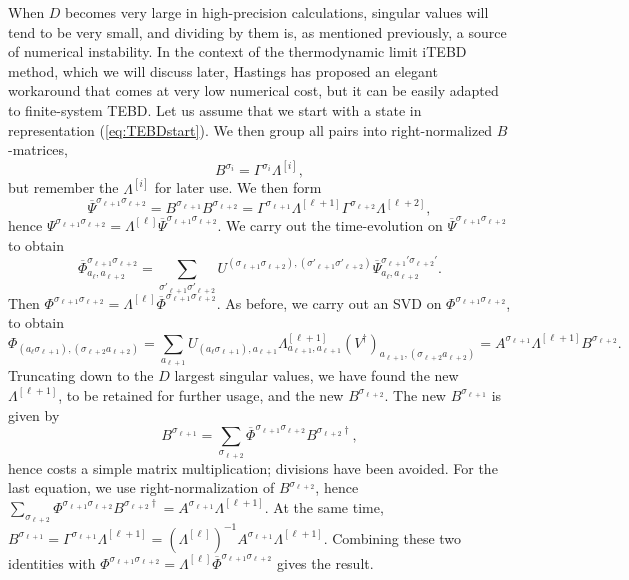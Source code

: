 When $D$ becomes very large in high-precision calculations, singular values will tend to be very small, and dividing by them is, as mentioned previously, a source of numerical instability. In the context of the thermodynamic limit iTEBD method, which we will discuss later, Hastings has proposed an elegant workaround that comes at very low numerical cost\cite{Hastings09}, but it can be easily adapted to finite-system TEBD. Let us assume that we start with a state in representation (\ref{eq:TEBDstart}). We then group all pairs into right-normalized $B$-matrices,
\begin{equation}
B^{\sigma_i} = \Gamma^{\sigma_i} \Lambda^{[i]} ,
\end{equation}
but remember the $\Lambda^{[i]}$ for later use. We then form
\begin{equation}
\overline{\Psi}^{\sigma_{\ell+1} \sigma_{\ell+2}} = B^{\sigma_{\ell+1}} B^{\sigma_{\ell+2}} =  \Gamma^{\sigma_{\ell+1}} \Lambda^{[\ell+1]}
\Gamma^{\sigma_{\ell+2}} \Lambda^{[\ell+2]} ,
\end{equation}
hence $\Psi^{\sigma_{\ell+1} \sigma_{\ell+2}} = \Lambda^{[\ell]} \overline{\Psi}^{\sigma_{\ell+1} \sigma_{\ell+2}}$. We carry out the time-evolution on $\overline{\Psi}^{\sigma_{\ell+1} \sigma_{\ell+2}}$ to obtain
\begin{equation}
\overline{\Phi}^{\sigma_{\ell+1}\sigma_{\ell+2}}_{a_\ell, a_{\ell+2}} = \sum_{\sigma'_{\ell+1} \sigma'_{\ell+2}}
U^{(\sigma_{\ell+1} \sigma_{\ell+2}), (\sigma'_{\ell+1} \sigma'_{\ell+2})}  \overline{\Psi}^{\sigma_{\ell+1}'\sigma_{\ell+2}'}_{a_\ell, a_{\ell+2}} .
\end{equation} 
Then $\Phi^{\sigma_{\ell+1} \sigma_{\ell+2}} = \Lambda^{[\ell]} \overline{\Phi}^{\sigma_{\ell+1} \sigma_{\ell+2}}$. As before, we carry out an SVD on $\Phi^{\sigma_{\ell+1} \sigma_{\ell+2}}$, to obtain 
\begin{equation}
\Phi_{(a_\ell \sigma_{\ell+1}), (\sigma_{\ell+2} a_{\ell+2})} = \sum_{a_{\ell+1}} U_{(a_\ell \sigma_{\ell+1}),a_{\ell+1}} \Lambda^{[\ell+1]}_{a_{\ell+1},a_{\ell+1}} (V^\dagger)_{a_{\ell+1}, (\sigma_{\ell+2} a_{\ell+2})} = A^{\sigma_{\ell+1}} \Lambda^{[\ell+1]} B^{\sigma_{\ell+2}} .
\end{equation}
Truncating down to the $D$ largest singular values, we have found the new $\Lambda^{[\ell+1]}$, to be retained for further usage, and the new $B^{\sigma_{\ell+2}}$. The new $B^{\sigma_{\ell+1}}$
is given by 
\begin{equation}
B^{\sigma_{\ell+1}} = \sum_{\sigma_{\ell+2}}  \overline{\Phi}^{\sigma_{\ell+1}\sigma_{\ell+2}}
B^{\sigma_{\ell+2}\dagger},
\end{equation}
hence costs a simple matrix multiplication; divisions have been avoided. For the last equation, we use right-normalization of $B^{\sigma_{\ell+2}}$, hence $\sum_{\sigma_{\ell+2}} \Phi^{\sigma_{\ell+1}\sigma_{\ell+2}} B^{\sigma_{\ell+2}\dagger} =  A^{\sigma_{\ell+1}} \Lambda^{[\ell+1]}$. At the same time, $B^{\sigma_{\ell+1}} = \Gamma^{\sigma_{\ell+1}} \Lambda^{[\ell+1]} = (\Lambda^{[\ell]})^{-1} A^{\sigma_{\ell+1}}  \Lambda^{[\ell+1]}$. Combining these two identities with $\Phi^{\sigma_{\ell+1} \sigma_{\ell+2}} = \Lambda^{[\ell]} \overline{\Phi}^{\sigma_{\ell+1} \sigma_{\ell+2}}$ gives the result.

